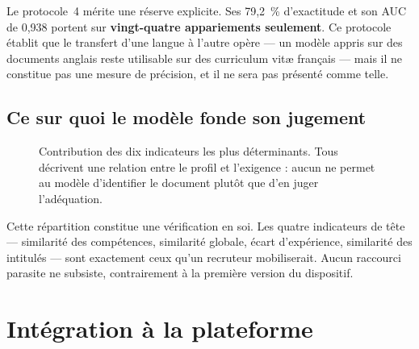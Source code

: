 \documentclass[11pt,a4paper]{article}
\begin{document}
Le protocole~4 mérite une réserve explicite. Ses 79,2~\% d'exactitude et son AUC de 0,938 portent sur \textbf{vingt-quatre appariements seulement}. Ce protocole établit que le transfert d'une langue à l'autre opère — un modèle appris sur des documents anglais reste utilisable sur des curriculum vitæ français — mais il ne constitue pas une mesure de précision, et il ne sera pas présenté comme telle.

\subsection{Ce sur quoi le modèle fonde son jugement}

\begin{figure}[H]
  \centering
  \caption{Contribution des dix indicateurs les plus déterminants. Tous décrivent une relation entre le profil et l'exigence : aucun ne permet au modèle d'identifier le document plutôt que d'en juger l'adéquation.}
  \label{fig:importances}
\end{figure}

\noindent Cette répartition constitue une vérification en soi. Les quatre indicateurs de tête — similarité des compétences, similarité globale, écart d'expérience, similarité des intitulés — sont exactement ceux qu'un recruteur mobiliserait. Aucun raccourci parasite ne subsiste, contrairement à la première version du dispositif.

\section{Intégration à la plateforme}
\end{document}
